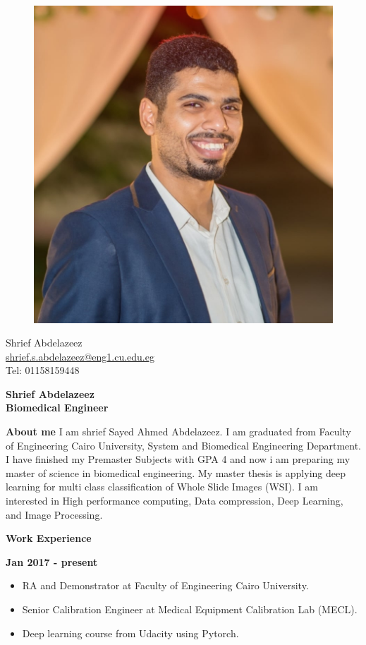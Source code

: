 \documentclass[a4paper,12pt,final]{memoir}
\newcommand{\Sep}{\vspace{1.5em}}
\newcommand{\SmallSep}{\vspace{0.5em}}
\newenvironment{AboutMe}
	{\ignorespaces\textbf{\color{RoyalBlue} About me}}
	{\Sep\ignorespacesafterend}
\newcommand{\CVSection}[1]
	{\Large\textbf{#1}\par
	\SmallSep\normalsize\normalfont}
\newcommand{\CVItem}[1]
	{\textbf{\color{RoyalBlue} #1}}
\begin{document}
\begin{figure}
	\hfill
	\includegraphics[width=0.6\columnwidth]{shrief.jpg}
	\vspace{-7cm}
\end{figure}

\begin{flushright}\small
	Shrief Abdelazeez \\
	\url{shrief.s.abdelazeez@eng1.cu.edu.eg}  \\
     Tel: 01158159448
\end{flushright}\normalsize
\framebreak


\Huge\bfseries {\color{RoyalBlue} Shrief Abdelazeez} \\
\Large\bfseries  Biomedical Engineer \\

\normalsize\normalfont

\begin{AboutMe}
I am shrief Sayed Ahmed Abdelazeez. I am graduated from Faculty of Engineering Cairo University, System and Biomedical Engineering Department. I have finished my Premaster Subjects with GPA 4 and now i am preparing my master of science in biomedical engineering. My master thesis is applying deep learning for multi class classification of Whole Slide Images (WSI). I am interested in High performance computing, Data compression, Deep Learning, and Image Processing.
\end{AboutMe}

\CVSection{Work Experience}
\CVItem{Jan 2017 - present}\\
\begin{itemize}
  \item RA and Demonstrator at Faculty of Engineering Cairo University.
  \item Senior Calibration Engineer at Medical Equipment Calibration Lab (MECL).
  \item Deep learning course from Udacity using Pytorch.
\end{itemize}
\SmallSep
\end{document}
